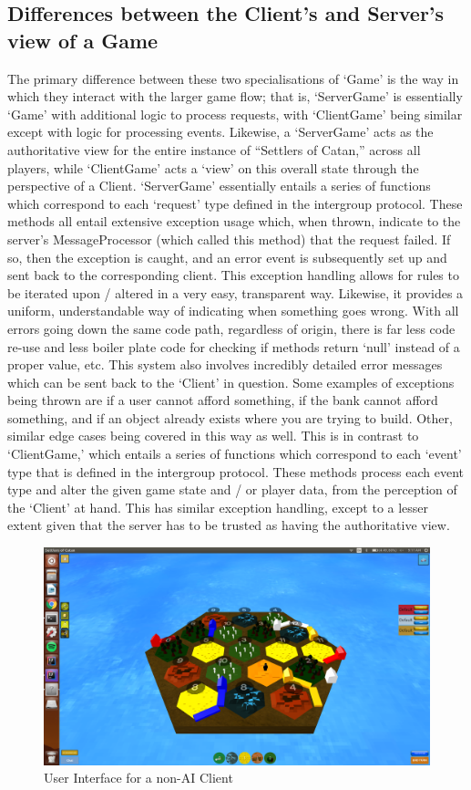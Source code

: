 \documentclass[a4paper,doc,draftfirst]{apa6}
\begin{document}
\subsection{Differences between the Client's and Server's view of a Game}
The primary difference between these two specialisations of ‘Game’ is the way in which they interact with the larger game flow; that is, ‘ServerGame’ is essentially ‘Game’ with additional logic to process requests, with ‘ClientGame’ being similar except with logic for processing events. Likewise, a ‘ServerGame’ acts as the authoritative view for the entire instance of “Settlers of Catan,” across all players, while ‘ClientGame’ acts a ‘view’ on this overall state through the perspective of a Client. ‘ServerGame’ essentially entails a series of functions which correspond to each ‘request’ type defined in the intergroup protocol. These methods all entail extensive exception usage which, when thrown, indicate to the server’s MessageProcessor (which called this method) that the request failed. If so, then the exception is caught, and an error event is subsequently set up and sent back to the corresponding client. This exception handling allows for rules to be iterated upon / altered in a very easy, transparent way. Likewise, it provides a uniform, understandable way of indicating when something goes wrong. With all errors going down the same code path, regardless of origin, there is far less code re-use and less boiler plate code for checking if methods return ‘null’ instead of a proper value, etc. This system also involves incredibly detailed error messages which can be sent back to the ‘Client’  in question. Some examples of exceptions being thrown are if a user cannot afford something, if the bank cannot afford something, and if an object already exists where you are trying to build. Other, similar edge cases being covered in this way as well. This is in contrast to ‘ClientGame,’ which entails a series of functions which correspond to each ‘event’ type that is defined in the intergroup protocol. These methods process each event type and alter the given game state and / or player data, from the perception of the ‘Client’ at hand. This has similar exception handling, except to a lesser extent given that the server has to be trusted as having the authoritative view.

\begin{figure}[hbtp]
      \includegraphics[width=\textwidth]{userInterface}
      \caption{User Interface for a non-AI Client}
\end{figure}
\end{document}
